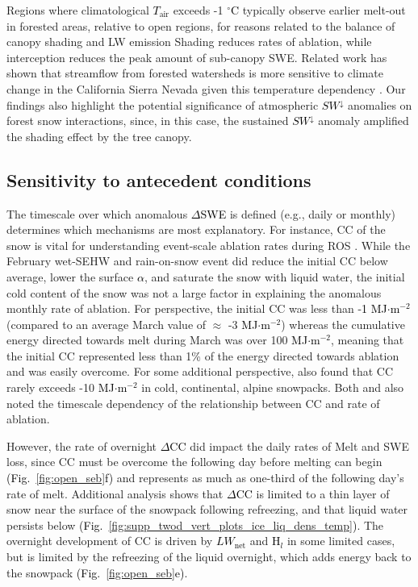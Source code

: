 \documentclass[draft]{agujournal2019}
\newcommand{\fig}[2]{\textcolor{black}{(Fig.~\ref{#1}{#2})}}   %
\newcommand{\mynum}[1]{\textcolor{black}{#1}}
\newcommand{\tair}{\textcolor{black}{$T_{\mathrm{air}}$}\xspace}
\newcommand{\lwnet}{\textcolor{black}{$LW_{\mathrm{net}}$}\xspace}
\newcommand{\hlat}{\textcolor{black}{H$_l$}\xspace}
\newcommand{\swdn}{\textcolor{black}{$SW^{\downarrow}$}\xspace}
\newcommand{\dcc}{\textcolor{black}{$\Delta$CC}\xspace}
\newcommand{\albedo}{\textcolor{black}{$\alpha$}\xspace}
\newcommand{\dswe}{\textcolor{black}{$\Delta$SWE}\xspace}
\newcommand{\degrc}{\textcolor{black}{$^\circ$C}\xspace}
\newcommand{\mjmtwo}{\textcolor{black}{MJ$\cdot$m$^{-2}$}\xspace}
\begin{document}
Regions where climatological \tair exceeds -1 \degrc typically observe earlier melt-out in forested areas, relative to open regions, for reasons related to the balance of canopy shading and LW emission \cite{Lundquist2013-uc}
Shading reduces rates of ablation, while interception reduces the peak amount of sub-canopy SWE. 
Related work has shown that streamflow from forested watersheds is more sensitive to climate change in the California Sierra Nevada given this temperature dependency \cite{Cristea2014-xk}.
Our findings also highlight the potential significance of atmospheric \swdn anomalies on forest snow interactions, since, in this case, the sustained \swdn anomaly amplified the shading effect by the tree canopy. 


\subsection{Sensitivity to antecedent conditions}
The timescale over which anomalous \dswe is defined (e.g., daily or monthly) determines which mechanisms are most explanatory.
For instance, CC of the snow is vital for understanding event-scale ablation rates during ROS \cite{Katz2023-ga}.
While the February wet-SEHW and rain-on-snow event did reduce the initial CC below average, lower the surface \albedo, and saturate the snow with liquid water, the initial cold content of the snow was not a large factor in explaining the anomalous monthly rate of ablation.
For perspective, the initial CC was less than -\mynum{1} \mjmtwo (compared to an average March value of $\approx$ -3 \mjmtwo) whereas the cumulative energy directed towards melt during March was over 100 \mjmtwo, meaning that the initial CC represented less than 1\% of the energy directed towards ablation and was easily overcome.
For some additional perspective,  also found that CC rarely exceeds -10 \mjmtwo in cold, continental, alpine snowpacks.
Both  and  also noted the timescale dependency of the relationship between CC and rate of ablation.

However, the rate of overnight \dcc did impact the daily rates of Melt and SWE loss, since CC must be overcome the following day before melting can begin \fig{fig:open_seb}{f} and represents as much as one-third of the following day's rate of melt.
Additional analysis shows that \dcc is limited to a thin layer of snow near the surface of the snowpack following refreezing, and that liquid water persists below \fig{fig:supp_twod_vert_plots_ice_liq_dens_temp}{}.
The overnight development of CC is driven by \lwnet and \hlat in some limited cases, but is limited by the refreezing of the liquid overnight, which adds energy back to the snowpack \fig{fig:open_seb}{e}.
\end{document}
